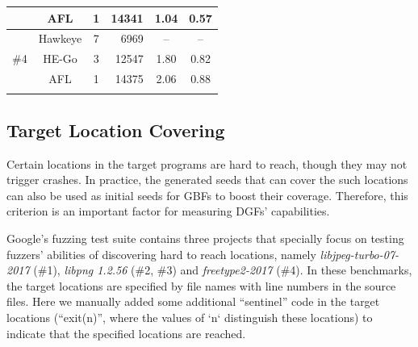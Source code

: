 \begin{table}[t]
\begin{tabular}{c|c|c|r|c|c}
        &      AFL   &        1                                              &                              14341                       &                    1.04                       &        0.57             \\ \hline
        \multirow{3}{*}{\#4} &  Hawkeye &                  7                                    &                6969                                     &                  --                 & --                             \\ \cline{2-6} 
        &      HE-Go  &       3                                               &                      12547                               &                 1.80                         &          0.82             \\ \cline{2-6} 
        &       AFL   &              1                                       &                  14375                                &             2.06                            &           0.88            \\ \thickhline
        
    \end{tabular}
\end{table} 


\subsection{Target Location Covering}\label{subsec:evalsrcloc}
Certain locations in the target programs are hard to reach, though they may not trigger crashes.
In practice, the generated seeds that can cover the such locations can also be used as initial seeds for GBFs to boost their coverage. 
Therefore, this criterion is an important factor for measuring DGFs' capabilities. 

Google's fuzzing test suite contains three projects that specially focus on testing fuzzers' abilities of discovering hard to reach locations, namely \emph{libjpeg-turbo-07-2017} (\#1), \emph{libpng 1.2.56} (\#2, \#3) and \emph{freetype2-2017} (\#4). 
In these benchmarks, the target locations are specified by file names with line numbers in the source files. 
Here we manually added some additional ``sentinel'' code in the target locations (``exit(n)'', where the values of `n` distinguish these locations) to indicate that the specified locations are reached. 


